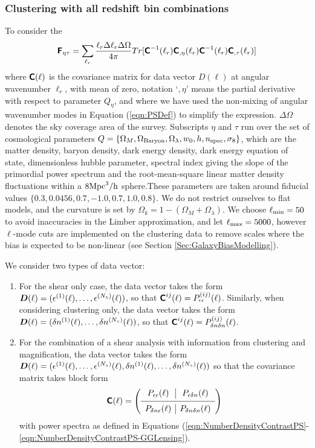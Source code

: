 \documentclass[useAMS,usenatbib,times,letter,amssymb]{mn2e}
\def\be{\begin{equation}}
\def\ee{\end{equation}}
\newcommand{\bm}[1]{\mbox{\boldmath{$#1$}}}   %
\begin{document}
\subsubsection{Clustering with all redshift bin combinations}\label{Sec:FM_Clustering_All}
To consider the 
\be
\mathbfss{F}_{\eta\tau} = \sum_{\ell_r}\frac{\ell_r\Delta\ell_r\Delta\Omega}{4\pi}Tr[\mathbfss{C}^{-1}(\ell_r)\mathbfss{C}_{,\eta}(\ell_r)\mathbfss{C}^{-1}(\ell_r)\mathbfss{C}_{,\tau}(\ell_r)]
\ee %
where $\textbf{\textsf{C}}(\ell)$ is the covariance matrix for data vector $D(\ell)$ at angular wavenumber $\ell_r$,  with mean of zero, notation `$,\eta$' means the partial derivative with respect to parameter $Q_{\eta}$, and where we have used the non-mixing of angular wavenumber modes in Equation (\ref{eqn:PSDef}) to simplify the expression.  $\Delta\Omega$ denotes the sky coverage area of the survey. Subscripts $\eta$ and $\tau$ run over the set of cosmological parameters $Q =\{\Omega_M,\Omega_{{\rm Baryon}}, \Omega_{\lambda}, w_0,  h, n_{{\rm spec}}, \sigma_8\}$, which are the matter density, baryon density, dark energy density, dark energy equation of state, dimensionless hubble parameter, spectral index giving the slope of the primordial power spectrum and the root-mean-square linear matter density fluctuations within a $8\rm{Mpc}^3/h$ sphere.These parameters are taken around fiducial values $\{0.3,0.0456,0.7,-1.0,0.7,1.0,0.8\}$. We do not restrict ourselves to flat models, and the curvature is set by $\Omega_k = 1-(\Omega_M + \Omega_{\lambda})$. We choose $\ell_{\rm min} = 50$ to avoid inaccuracies in the Limber approximation, and let $\ell_{\rm max} = 5000$, however $\ell$-mode cuts are implemented on the clustering data to remove scales where the bias is expected to be non-linear (see Section \ref{Sec:GalaxyBiasModelling}).

We consider two types of data vector:
\begin{enumerate}
\item{For the shear only case, the data vector takes the form $\bm{D}(\ell) = (\epsilon^{(1)}(\ell),\ldots,\epsilon^{(N_z)}(\ell))$, so that $\textbf{\textsf{C}}^{ij}(\ell) = P^{(ij)}_{\epsilon\epsilon}(\ell)$. Similarly, when considering clustering only, the data vector takes the form $\bm{D}(\ell) = (\delta n^{(1)}(\ell),\ldots,\delta n^{(N_z)}(\ell))$, so that $\textbf{\textsf{C}}^{ij}(\ell) = P^{(ij)}_{\delta n\delta n}(\ell)$.}
\item{For the combination of a shear analysis with information from clustering and magnification, the data vector takes the form $\bm{D}(\ell) = (\epsilon^{(1)}(\ell),\ldots,\epsilon^{(N_z)}(\ell),\delta n^{(1)}(\ell),\ldots,\delta n^{(N_z)}(\ell))$ so that the covariance matrix takes block form
\be
\mathbfss{C}(\ell) = \left(\begin{array}{c|c} P_{\epsilon\epsilon}(\ell)&P_{\epsilon \delta n}(\ell)\\\hline P_{\delta n \epsilon}(\ell)&P_{\delta n\delta n}(\ell)\end{array}\right)
\ee
with power spectra as defined in Equations (\ref{eqn:NumberDensityContrastPS}-\ref{eqn:NumberDensityContrastPS-GGLensing}).
}
\end{enumerate}
\end{document}
